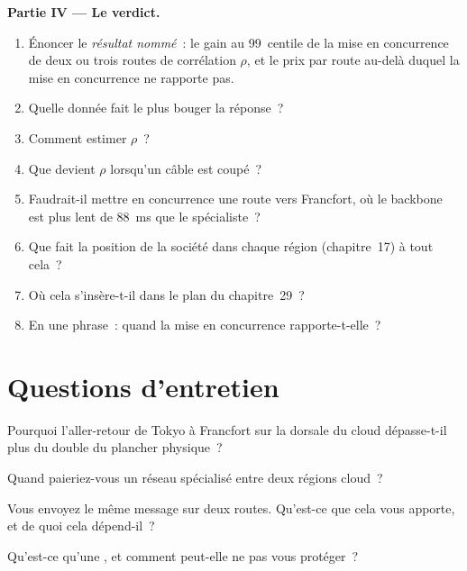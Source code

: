 \begin{problem}
\medskip\noindent\textbf{Partie IV --- Le verdict.}
\begin{enumerate}[resume]
\item Énoncer le \emph{résultat nommé}~: le gain au 99~centile de la mise en concurrence de deux ou trois routes de corrélation $\rho$, et le prix par route au-delà
  duquel la mise en concurrence ne rapporte pas.
\item Quelle donnée fait le plus bouger la réponse~?
\item Comment estimer $\rho$~?
\item Que devient $\rho$ lorsqu'un câble est coupé~?
\item Faudrait-il mettre en concurrence une route vers Francfort, où le backbone est plus lent de 88~ms que le spécialiste~?
\item Que fait la position de la société dans chaque région (chapitre~17) à tout cela~?
\item Où cela s'insère-t-il dans le plan du chapitre~29~?
\item En une phrase~: quand la mise en concurrence rapporte-t-elle~?
\end{enumerate}
\end{problem}

\section{Questions d'entretien}

\begin{interviewq}\label{iq:nw:cross-region-crypto-networks:1}
Pourquoi l'aller-retour de Tokyo à Francfort sur la dorsale du cloud dépasse-t-il plus du double du plancher physique~?
\end{interviewq}

\begin{interviewq}\label{iq:nw:cross-region-crypto-networks:2}
Quand paieriez-vous un réseau spécialisé entre deux régions cloud~?
\end{interviewq}

\begin{interviewq}\label{iq:nw:cross-region-crypto-networks:3}
Vous envoyez le même message sur deux routes. Qu'est-ce que cela vous apporte, et de quoi cela dépend-il~?
\end{interviewq}

\begin{interviewq}\label{iq:nw:cross-region-crypto-networks:4}
Qu'est-ce qu'une , et comment peut-elle ne pas vous protéger~?
\end{interviewq}


